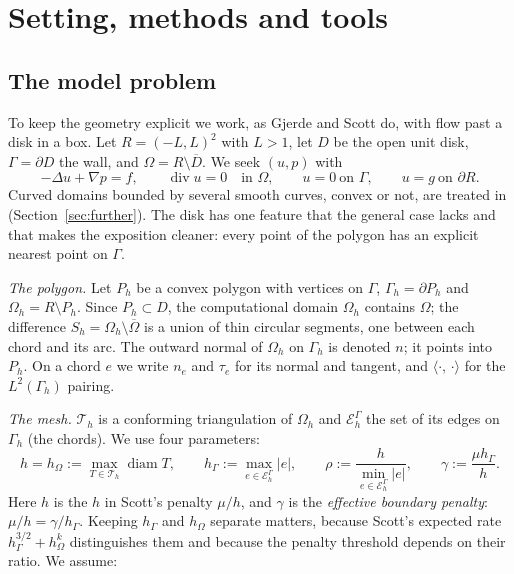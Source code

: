 \documentclass[pdflatex,sn-mathphys-num]{sn-jnl}
\theoremstyle{thmstyleone}
\theoremstyle{thmstylethree}
\newcommand{\hG}{h_\Gamma}
\newcommand{\hO}{h_\Omega}
\newcommand{\Gh}{\Gamma_h}
\newcommand{\Oh}{\Omega_h}
\newcommand{\Th}{\mathcal T_h}
\newcommand{\EG}{\mathcal E_h^\Gamma}
\newcommand{\ip}[2]{\langle #1,\, #2\rangle}
\renewcommand{\div}{\operatorname{div}}
\DeclareMathOperator{\diam}{diam}
\begin{document}
\section{Setting, methods and tools}\label{sec:setting}

\subsection{The model problem}
To keep the geometry explicit we work, as Gjerde and Scott do, with flow past a disk in a box. Let $R=(-L,L)^2$ with $L>1$, let $D$ be the open unit disk, $\Gamma=\partial D$ the wall, and $\Omega=R\setminus\overline D$. We seek $(u,p)$ with
\[
-\Delta u+\nabla p=f,\qquad \div u=0\quad\text{in }\Omega,\qquad u=0\ \text{on }\Gamma,\qquad u=g\ \text{on }\partial R .
\]
Curved domains bounded by several smooth curves, convex or not, are treated in \cite{PadhiExt} (Section~\ref{sec:further}). The disk has one feature that the general case lacks and that makes the exposition cleaner: every point of the polygon has an explicit nearest point on $\Gamma$.

\emph{The polygon.} Let $P_h$ be a convex polygon with vertices on $\Gamma$, $\Gh=\partial P_h$ and $\Oh=R\setminus P_h$. Since $P_h\subset D$, the computational domain $\Oh$ contains $\Omega$; the difference $S_h=\Oh\setminus\overline\Omega$ is a union of thin circular segments, one between each chord and its arc. The outward normal of $\Oh$ on $\Gh$ is denoted $n$; it points into $P_h$. On a chord $e$ we write $n_e$ and $\tau_e$ for its normal and tangent, and $\ip{\cdot}{\cdot}$ for the $L^2(\Gh)$ pairing.

\emph{The mesh.} $\Th$ is a conforming triangulation of $\Oh$ and $\EG$ the set of its edges on $\Gh$ (the chords). We use four parameters:
\[
h=\hO:=\max_{T\in\Th}\diam T,\qquad
\hG:=\max_{e\in\EG}|e|,\qquad
\rho:=\frac{h}{\min_{e\in\EG}|e|},\qquad
\gamma:=\frac{\mu\hG}{h}.
\]
Here $h$ is the $h$ in Scott's penalty $\mu/h$, and $\gamma$ is the \emph{effective boundary penalty}: $\mu/h=\gamma/\hG$. Keeping $\hG$ and $\hO$ separate matters, because Scott's expected rate $\hG^{3/2}+\hO^k$ distinguishes them and because the penalty threshold depends on their ratio. We assume:
\end{document}

